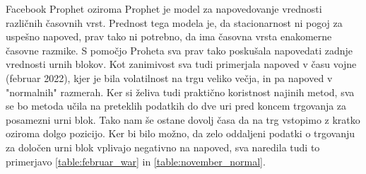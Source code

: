 \documentclass[12pt,a4paper]{amsart}
\theoremstyle{definition} %
\theoremstyle{plain} %
\begin{document}
Facebook Prophet oziroma Prophet je model za napovedovanje vrednosti različnih časovnih vrst. Prednost tega modela je, da stacionarnost ni pogoj za uspešno napoved, prav tako ni potrebno, da ima časovna vrsta enakomerne časovne razmike.
S pomočjo Proheta sva prav tako poskušala napovedati zadnje vrednosti urnih blokov. Kot zanimivost sva tudi primerjala napoved v času vojne (februar 2022), kjer je bila volatilnost na trgu veliko večja, in pa napoved v "normalnih" razmerah.
Ker si želiva tudi praktično koristnost najinih metod, sva se bo metoda učila na preteklih podatkih do dve uri pred koncem trgovanja za posamezni urni blok. Tako nam še ostane dovolj časa da na trg vstopimo z kratko oziroma dolgo pozicijo.
Ker bi bilo možno, da zelo oddaljeni podatki o trgovanju za določen urni blok vplivajo negativno na napoved, sva naredila tudi to primerjavo \ref{table:februar_war} in \ref{table:november_normal}. %



\begin{table}[]
    \caption{Tabela povprečij posameznih intervalov za 50 dni od 10. novembra 2021}
    \label{table:november_normal}
\end{table}
\end{document}
